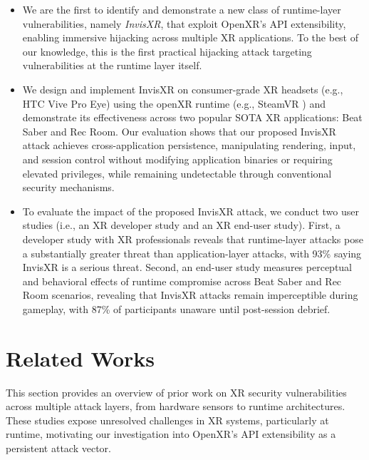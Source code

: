 \documentclass[letterpaper,twocolumn,10pt]{article}
\begin{document}
\begin{itemize}
\item We are the first to identify and demonstrate a new class of runtime-layer vulnerabilities, namely \textit{InvisXR}, that exploit OpenXR’s API extensibility, enabling immersive hijacking across multiple XR applications. To the best of our knowledge, this is the first practical hijacking attack targeting vulnerabilities at the runtime layer itself.

\item We design and implement InvisXR on consumer-grade XR headsets (e.g., HTC Vive Pro Eye) using the openXR runtime (e.g., SteamVR ) and demonstrate its effectiveness across two popular SOTA XR applications: Beat Saber and Rec Room. Our evaluation shows that our proposed InvisXR attack achieves cross-application persistence, manipulating rendering, input, and session control without modifying application binaries or requiring elevated privileges, while remaining undetectable through conventional security mechanisms.


\item To evaluate the impact of the proposed InvisXR attack, we conduct two user studies (i.e., an XR developer study and an XR end-user study). First, a developer study with XR professionals reveals that runtime-layer attacks pose a substantially greater threat than application-layer attacks, with 93\% saying InvisXR is a serious threat. Second, an end-user study measures perceptual and behavioral effects of runtime compromise across Beat Saber and Rec Room scenarios, revealing that InvisXR attacks remain imperceptible during gameplay, with 87\% of participants unaware until post-session debrief.

\end{itemize}

\section{Related Works} 
This section provides an overview of prior work on XR security vulnerabilities across multiple attack layers, from hardware sensors to runtime architectures. These studies expose unresolved challenges in XR systems, particularly at runtime, motivating our investigation into OpenXR's API extensibility as a persistent attack vector.
\end{document}
